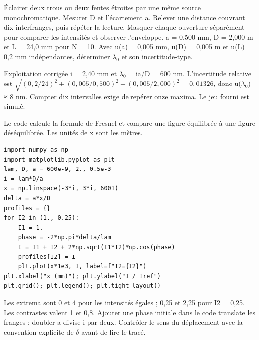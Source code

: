 Éclairer deux trous ou deux fentes étroites par une même source monochromatique. Mesurer D et l’écartement a. Relever une distance couvrant dix interfranges, puis répéter la lecture. Masquer chaque ouverture séparément pour comparer les intensités et observer l’enveloppe.
a = 0,500 mm, D = 2,000 m et L = 24,0 mm pour N = 10. Avec u(a) = 0,005 mm, u(D) = 0,005 m et u(L) = 0,2 mm indépendantes, déterminer \ensuremath{\lambda_0} et son incertitude-type.
\begin{methode}{Exploitation corrigée}
i = 2,40 mm et \ensuremath{\lambda_0} = ia/D = 600 nm. L’incertitude relative est $\sqrt{(0{,}2/24)^2+(0{,}005/0{,}500)^2+(0{,}005/2{,}000)^2}=0{,}01326$, donc u(\ensuremath{\lambda_0}) ≈ 8 nm. Compter dix intervalles exige de repérer onze maxima. Le jeu fourni est simulé.
\end{methode}


Le code calcule la formule de Fresnel et compare une figure équilibrée à une figure déséquilibrée. Les unités de x sont les mètres.
\begin{verbatim}
import numpy as np
import matplotlib.pyplot as plt
lam, D, a = 600e-9, 2., 0.5e-3
i = lam*D/a
x = np.linspace(-3*i, 3*i, 6001)
delta = a*x/D
profiles = {}
for I2 in (1., 0.25):
    I1 = 1.
    phase = -2*np.pi*delta/lam
    I = I1 + I2 + 2*np.sqrt(I1*I2)*np.cos(phase)
    profiles[I2] = I
    plt.plot(x*1e3, I, label=f"I2={I2}")
plt.xlabel("x (mm)"); plt.ylabel("I / Iref")
plt.grid(); plt.legend(); plt.tight_layout()
\end{verbatim}
Les extrema sont 0 et 4 pour les intensités égales ; 0,25 et 2,25 pour I2 = 0,25. Les contrastes valent 1 et 0,8. Ajouter une phase initiale dans le code translate les franges ; doubler a divise i par deux. Contrôler le sens du déplacement avec la convention explicite de \ensuremath{\delta} avant de lire le tracé.


